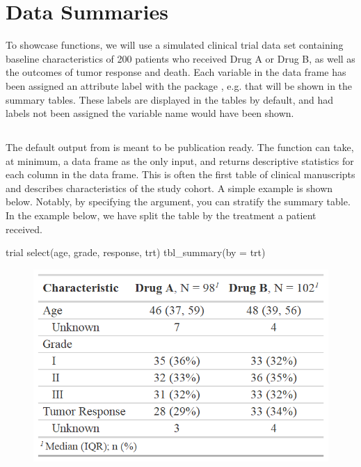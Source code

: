 \section{Data Summaries}

To showcase  functions, we will use a simulated clinical trial data set containing baseline characteristics of 200 patients who received Drug A or Drug B, as well as the outcomes of tumor response and death.
Each variable in the data frame has been assigned an attribute label with the  package \citep{labelled}, e.g.  that will be shown in the summary tables. 
These labels are displayed in the  tables by default, and had labels not been assigned the variable name would have been shown.



\subsection{\texorpdfstring{}{tbl\_summary()}}

The default output from  is meant to be publication ready.
The  function can take, at minimum, a data frame as the only input, and returns descriptive statistics for each column in the data frame.
This is often the first table of clinical manuscripts and describes characteristics of the study cohort.
A simple example is shown below.
Notably, by specifying the  argument, you can stratify the summary table. 
In the example below, we have split the table by the treatment a patient received. 

\begin{example}
trial %
  select(age, grade, response, trt) %
  tbl_summary(by = trt)
\end{example}
\begin{figure}[h!]
  \includegraphics[scale=0.49]{summary_basic.png}
  \centering
\end{figure}

